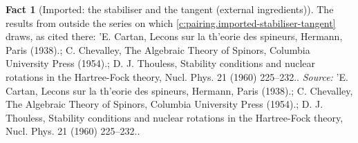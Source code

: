 \documentclass[11pt]{article}
\theoremstyle{definition}
\newtheorem{fact}[theorem]{Fact}
\theoremstyle{plain}
\begin{document}
\begin{fact}[Imported: the stabiliser and the tangent (external ingredients)]\label{c:pairing.imported-stabiliser-tangent-external}
The results from outside the series on which \ref{c:pairing.imported-stabiliser-tangent} draws, as cited there: 'E. Cartan, Lecons sur la th'eorie des spineurs, Hermann, Paris (1938).; C. Chevalley, The Algebraic Theory of Spinors, Columbia University Press (1954).; D. J. Thouless, Stability conditions and nuclear rotations in the Hartree-Fock theory, Nucl. Phys. 21 (1960) 225--232..
\emph{Source:} 'E. Cartan, Lecons sur la th'eorie des spineurs, Hermann, Paris (1938).; C. Chevalley, The Algebraic Theory of Spinors, Columbia University Press (1954).; D. J. Thouless, Stability conditions and nuclear rotations in the Hartree-Fock theory, Nucl. Phys. 21 (1960) 225--232..
\end{fact}
\end{document}
